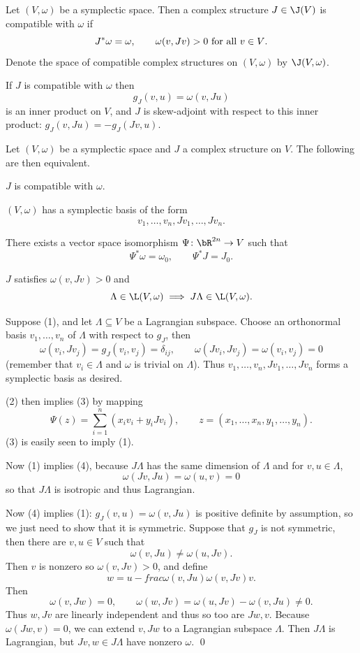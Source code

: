 \bdefn

    Let $(V,\omega)$ be a symplectic space.
    Then a complex structure $J\in\J(V)$ is {\emphcolor compatible} with $\omega$ if
    $$ J^*\omega = \omega,\qquad \omega(v,Jv) > 0 \hbox{ for all $v\in V$} . $$
    Denote the space of compatible complex structures on $(V,\omega)$ by $\J(V,\omega)$.

\edefn

If $J$ is compatible with $\omega$ then
$$ g_J(v,u) = \omega(v,Ju) $$
is an inner product on $V$, and $J$ is skew-adjoint with respect to this inner product: $g_J(v,Ju)=-g_J(Jv,u)$.

\bprop[name={compatcompstruct}]

    Let $(V,\omega)$ be a symplectic space and $J$ a complex structure on $V$.
    The following are then equivalent.
    \benum
        \item $J$ is compatible with $\omega$.
        \item $(V,\omega)$ has a symplectic basis of the form
        $$ v_1,\dots,v_n,Jv_1,\dots,Jv_n . $$
        \item There exists a vector space isomorphism $\Psi\colon\bR^{2n}\to V$ such that
        $$ \Psi^*\omega = \omega_0,\qquad \Psi^*J = J_0 . $$
        \item $J$ satisfies $\omega(v,Jv)>0$ and
        $$ \Lambda \in \L(V,\omega) \implies J\Lambda \in \L(V,\omega) . $$
    \eenum

\eprop

\bproof

    Suppose (1), and let $\Lambda\subseteq V$ be a Lagrangian subspace.
    Choose an orthonormal basis $v_1,\dots,v_n$ of $\Lambda$ with respect to $g_J$, then
    $$ \omega(v_i,Jv_j) = g_J(v_i,v_j) = \delta_{ij},\qquad \omega(Jv_i,Jv_j) = \omega(v_i,v_j) = 0 $$
    (remember that $v_i\in\Lambda$ and $\omega$ is trivial on $\Lambda$).
    Thus $v_1,\dots,v_n,Jv_1,\dots,Jv_n$ forms a symplectic basis as desired.

    (2) then implies (3) by mapping
    $$ \Psi(z) = \sum_{i=1}^n(x_iv_i + y_iJv_i),\qquad z = (x_1,\dots,x_n,y_1,\dots,y_n) . $$
    (3) is easily seen to imply (1).

    Now (1) implies (4), because $J\Lambda$ has the same dimension of $\Lambda$ and for $v,u\in\Lambda$,
    $$ \omega(Jv,Ju) = \omega(u,v) = 0 $$
    so that $J\Lambda$ is isotropic and thus Lagrangian.

    Now (4) implies (1): $g_J(v,u)=\omega(v,Ju)$ is positive definite by assumption, so we just need to show that it is symmetric.
    Suppose that $g_J$ is not symmetric, then there are $v,u\in V$ such that
    $$ \omega(v,Ju) \neq \omega(u,Jv) . $$
    Then $v$ is nonzero so $\omega(v,Jv)>0$, and define
    $$ w = u - frac{\omega(v,Ju)}{\omega(v,Jv)}v . $$
    Then
    $$ \omega(v,Jw)  = 0,\qquad \omega(w,Jv) = \omega(u,Jv) - \omega(v,Ju) \neq 0 . $$
    Thus $w,Jv$ are linearly independent and thus so too are $Jw,v$.
    Because $\omega(Jw,v)=0$, we can extend $v,Jw$ to a Lagrangian subspace $\Lambda$.
    Then $J\Lambda$ is Lagrangian, but $Jv,w\in J\Lambda$ have nonzero $\omega$.
    \qed

